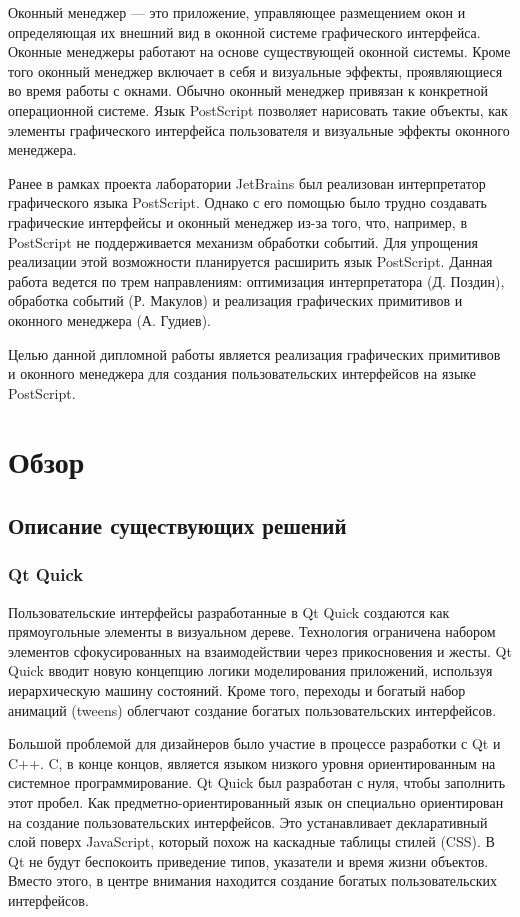\documentclass[14pt]{extarticle}
\begin{document}
	Оконный менеджер — это приложение, управляющее размещением окон и определяющая их внешний вид в оконной системе графического интерфейса. Оконные менеджеры работают на основе существующей оконной системы. Кроме того оконный менеджер включает в себя и визуальные эффекты, проявляющиеся во время работы с окнами. Обычно оконный менеджер привязан к конкретной операционной системе. Язык PostScript позволяет нарисовать такие объекты, как элементы графического интерфейса пользователя и визуальные эффекты оконного менеджера.
	
	Ранее в рамках проекта лаборатории JetBrains был реализован интерпретатор графического языка PostScript. Однако с его помощью было трудно создавать графические интерфейсы и оконный менеджер из-за того, что, например, в PostScript не поддерживается механизм обработки событий. Для упрощения реализации этой возможности планируется расширить язык PostScript. Данная работа ведется по трем направлениям: оптимизация интерпретатора (Д. Поздин), обработка событий (Р. Макулов) и реализация графических примитивов и оконного менеджера (А. Гудиев).
	
	Целью данной дипломной работы является реализация графических примитивов и оконного менеджера для создания пользовательских интерфейсов на языке PostScript.
	
	\pagebreak
	\section{Обзор}
	\subsection{ Описание существующих решений }
		\subsubsection*{Qt Quick}

Пользовательские интерфейсы разработанные в Qt Quick создаются как прямоугольные элементы в визуальном дереве. Технология ограничена набором элементов сфокусированных на взаимодействии через прикосновения и жесты. Qt Quick вводит новую концепцию логики моделирования приложений, используя иерархическую машину состояний. Кроме того, переходы и богатый набор анимаций (tweens) облегчают создание богатых пользовательских интерфейсов.

Большой проблемой для дизайнеров было участие в процессе разработки с Qt и C++. C, в конце концов, является языком низкого уровня ориентированным на системное программирование. Qt Quick был разработан с нуля, чтобы заполнить этот пробел. Как предметно-ориентированный язык он специально ориентирован на создание пользовательских интерфейсов. Это устанавливает декларативный слой поверх JavaScript, который похож на каскадные таблицы стилей (CSS). В Qt не будут беспокоить приведение типов, указатели и время жизни объектов. Вместо этого, в центре внимания находится создание богатых пользовательских интерфейсов. 		
		
\end{document}

